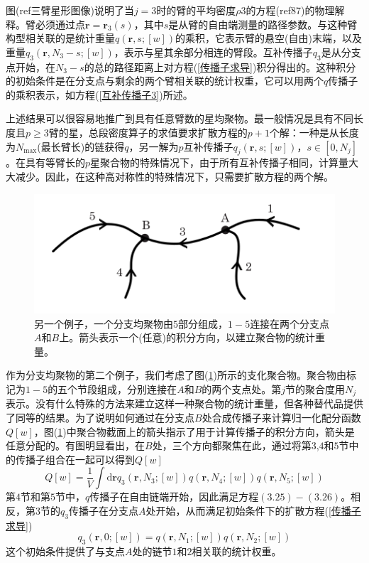 图(ref{三臂星形图像})说明了当$j=3$时的臂的平均密度$\rho 3$的方程(ref{87})的物理解释。臂必须通过点$\mathbf{r}=\mathbf{r}_3(s)$，其中$s$是从臂的自由端测量的路径参数。与这种臂构型相关联的是统计重量$q(\mathbf{r},s;[w])$的乘积，它表示臂的悬空(自由)末端，以及重量$q_{3}(\mathbf{r},N_{3}-s;[w])$，表示与星其余部分相连的臂段。互补传播子$q_3$是从分支点开始，在$N_3-s$的总的路径距离上对方程(\ref{传播子求导})积分得出的。这种积分的初始条件是在分支点与剩余的两个臂相关联的统计权重，它可以用两个$q$传播子的乘积表示，如方程(\ref{互补传播子3})所述。

上述结果可以很容易地推广到具有任意臂数的星均聚物。最一般情况是具有不同长度且$p\geq3$臂的星，总段密度算子的求值要求扩散方程的$p+1$个解：一种是从长度为$N_{\max}$(最长臂长)的链获得$q$，另一解为$p$互补传播子$q_j(\mathbf{r},s;[w])$，$s\in [0,N_j]$。在具有等臂长的$p$星聚合物的特殊情况下，由于所有互补传播子相同，计算量大大减少。因此，在这种高对称性的特殊情况下，只需要扩散方程的两个解。

\begin{figure}[H]
\centering
\includegraphics[scale=0.7]{./figures/36.png}
\caption{另一个例子，一个分支均聚物由$5$部分组成，$1-5$连接在两个分支点$A$和$B$上。箭头表示一个(任意)的积分方向，以建立聚合物的统计重量。}
\label{AB嵌段}
\end{figure}

作为分支均聚物的第二个例子，我们考虑了图(\ref{AB嵌段})所示的支化聚合物。聚合物由标记为$1-5$的五个节段组成，分别连接在$A$和$B$的两个支点处。第$j$节的聚合度用$N_j$表示。没有什么特殊的方法来建立这样一种聚合物的统计重量，但各种替代品提供了同等的结果。为了说明如何通过在分支点$B$处合成传播子来计算归一化配分函数$Q[w]$，图(\ref{AB嵌段})中聚合物截面上的箭头指示了用于计算传播子的积分方向，箭头是任意分配的。有图明显看出，在$B$处，三个方向都聚焦在此，通过将第$3$,$4$和$5$节中的传播子组合在一起可以得到$Q[w]$
\begin{equation}
Q[w]=\frac{1}{V}\int \mathrm{d}\mathbf{r}q_3(\mathbf{r},N_3;[w])q(\mathbf{r},N_4;[w])q(\mathbf{r},N_5;[w])
\end{equation}
第$4$节和第$5$节中，$q$传播子在自由链端开始，因此满足方程$(3.25)-(3.26)$。相反，第3节的$q_3$传播子在分支点$A$处开始，从而满足初始条件下的扩散方程(\ref{传播子求导})
\begin{equation}
q_3(\mathbf{r},0;[w])=q(\mathbf{r},N_1;[w])q(\mathbf{r},N_2;[w])
\end{equation}
这个初始条件提供了与支点$A$处的链节$1$和$2$相关联的统计权重。


